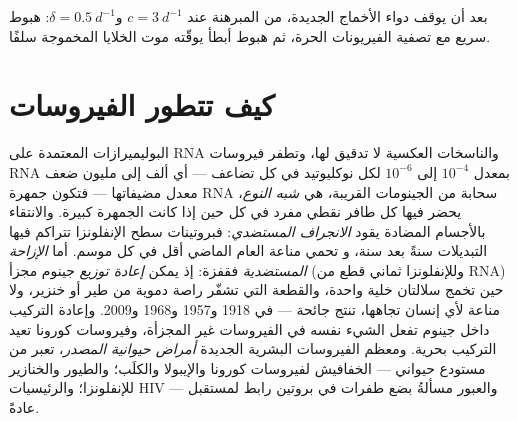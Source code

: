 \begin{omfigure}

{\small {} بعد أن يوقف دواء الأخماج الجديدة، من المبرهنة
عند $c = \qty{3}{d^{-1}}$ و$\delta = \qty{0.5}{d^{-1}}$: هبوط سريع
مع تصفية الفيريونات الحرة، ثم هبوط أبطأ يوقّته موت
الخلايا المخموجة سلفًا.}
\end{omfigure}

\section{كيف تتطور الفيروسات}

\begin{definition}\label{def:b3:virology:evolution}
البوليميرازات المعتمدة على RNA والناسخات العكسية لا تدقيق
لها، وتطفر فيروسات RNA بمعدل $10^{-4}$ إلى $10^{-6}$ لكل
نوكليوتيد في كل تضاعف --- أي ألف إلى مليون ضعف معدل
مضيفاتها --- فتكون جمهرة  RNA سحابة من
الجينومات القريبة، هي \emph{شبه النوع}، يحضر فيها كل طافر نقطي
مفرد في كل حين إذا كانت الجمهرة كبيرة. والانتقاء
بالأجسام المضادة يقود \emph{الانجراف المستضدي}: فبروتينات سطح
الإنفلونزا تتراكم فيها التبديلات سنةً بعد سنة، و
تحمي مناعة العام الماضي أقل في كل موسم. أما \emph{الإزاحة المستضدية} فقفزة: إذ
يمكن \emph{إعادة توزيع} جينوم مجزأ (وللإنفلونزا ثماني قطع من RNA)
حين تخمج سلالتان خلية واحدة، والقطعة التي
تشفّر راصة دموية من  طير أو خنزير، ولا مناعة لأي إنسان
تجاهها، تنتج جائحة --- في 1918 و1957 و1968 و2009.
وإعادة التركيب داخل جينوم تفعل الشيء نفسه في الفيروسات غير المجزأة،
وفيروسات كورونا تعيد التركيب بحرية. ومعظم الفيروسات البشرية الجديدة
\emph{أمراض حيوانية المصدر}، تعبر من مستودع حيواني --- الخفافيش لفيروسات
كورونا والإيبولا والكلَب؛ والطيور والخنازير للإنفلونزا؛ والرئيسيات
 HIV --- والعبور مسألةُ بضع طفرات في
بروتين رابط لمستقبل عادةً.
\end{definition}

